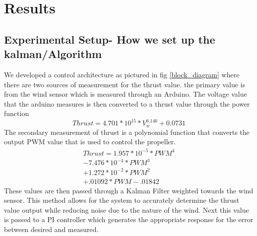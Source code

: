 \documentclass[conference]{IEEEtran}
\begin{document}
	\section{Results}
	\subsection{Experimental Setup- How we set up the kalman/Algorithm}

	We developed a control architecture as pictured in fig \ref{block_diagram} where there are two sources of measurement for the thrust value. the primary value is from the wind sensor which is measured through an Arduino. The voltage value that the arduino measures is then converted to a thrust value through the power function
	\begin{equation}
	Thrust = 4.701 * 10^{15} * V_w^{6.146} + 0.0731
	\label{wind_power}
	\end{equation}
	The secondary measurement of thrust is a polynomial function that converts the output PWM value that is used to control the propeller. \newline
	\begin{eqnarray}
	Thrust = 1.957*10^{-5}*PWM^4 \\
	- 7.476*10^{-4}*PWM^3 \nonumber\\ 
	+ 1.272*10^{-2}*PWM^2 \nonumber\\
	+ .01092*PWM - .01842 \nonumber
	\label{pwm_poly}
	\end{eqnarray}
	These values are then passed through a Kalman Filter weighted towards the wind sensor. This method allows for the system to accurately determine the thrust value output while reducing noise due to the nature of the wind. Next this value is passed to a PI controller which generates the appropriate response for the error between desired and measured. 
\end{document}
